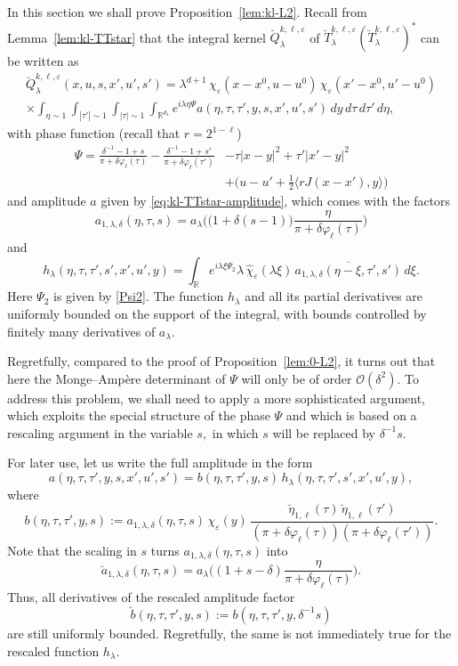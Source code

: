 \documentclass[leqno]{amsart}
\theoremstyle{definition}
\theoremstyle{remark}
\numberwithin{equation}{section}
\newcommand{\R}{\mathbb{R}}
\renewcommand{\hat}{\widehat}
\newcommand\la{{\lambda}}
\newcommand\de{{\delta}}
\begin{document}
In this section we shall prove Proposition~\ref{lem:kl-L2}. Recall from Lemma~\ref{lem:kl-TTstar} that the integral kernel $\breve Q^{k,\ell,\varepsilon}_{\lambda}$ of $\breve T^{k,\ell,\varepsilon}_\lambda(\breve T^{k,\ell,\varepsilon}_\lambda)^*$ can be written as
\begin{multline*}
\breve Q^{k,\ell,\varepsilon}_{\lambda}(x,u,s,x',u',s')
 = \lambda^{d+1}\,\chi_\varepsilon(x-x^0,u-u^0)\,\chi_\varepsilon(x'-x^0,u'-u^0) \\
\times \int_{\eta\sim 1} \int_{|\tau'|\sim 1} \int_{|\tau|\sim 1} \int_{\R^{d_1}}
e^{i\lambda \eta \Psi}
a(\eta,\tau,\tau',y,s,x',u',s')\,dy\,d\tau\,d\tau'\,d\eta,
\end{multline*}
with phase function (recall that $r=2^{1-\ell}$)
\begin{align*}
\Psi
= \frac{\delta^{-1}-1+s}{\pi+\delta\varphi_\ell(\tau)}
-\frac{\delta^{-1}-1+s'}{\pi+\delta\varphi_\ell(\tau')}
&-\tau|x-y|^2+\tau'|x'-y|^2 \\
&+\big(u-u'+\tfrac12\langle rJ(x-x'),y\rangle\big)
\end{align*}
and amplitude $a$ given by \eqref{eq:kl-TTstar-amplitude}, which comes with the factors
\[
a_{1,\la,\de}(\eta,\tau,s)
=
a_\la\Big(\big(1+\delta(s-1)\big)
\frac{\eta}{\pi+\delta\varphi_\ell(\tau)}\Big)
\]
and
\[
h_\lambda(\eta,\tau,\tau',s',x',u',y)
=
\int_\R e^{i\lambda\xi\Psi_2}
\lambda\,\hat\chi_\varepsilon(\lambda\xi)\,
\overline{a_{1,\la,\de}(\eta-\xi,\tau',s')}\,d\xi.
\]
Here $\Psi_2$ is given by \eqref{Psi2}. The function $h_\lambda$ and all its partial derivatives are uniformly bounded on the support of the integral, with bounds controlled by finitely many derivatives of $a_\la$.

Regretfully, compared to the proof of Proposition~\ref{lem:0-L2}, it turns out that here the Monge--Ampère determinant of $\Psi$ will only be of order $\mathcal{O}(\delta^2)$. To address this problem, we shall need to apply a more sophisticated argument, which exploits the special structure of the phase $\Psi$ and which is based on  a rescaling argument in the variable $s,$ in which $s$ will be replaced by $\delta^{-1} s$. 

For later use, let us write the full amplitude in the form
\[
a(\eta,\tau,\tau',y,s,x',u',s')
=
b(\eta,\tau,\tau',y,s)\,
h_\lambda(\eta,\tau,\tau',s',x',u',y),
\]
where
\begin{equation}\label{amplia}
b(\eta,\tau,\tau',y,s)
:=
a_{1,\la,\de}(\eta,\tau,s)\,\chi_\varepsilon(y)\,
\frac{\breve\eta_{1,\ell}(\tau)\,\breve\eta_{1,\ell}(\tau')}
{(\pi+\delta\varphi_\ell(\tau))(\pi+\delta\varphi_\ell(\tau'))}.
\end{equation}
Note that the scaling in $s$ turns $a_{1,\la,\de}(\eta,\tau,s)$ into
\begin{equation}\label{atilde3}
\breve a_{1,\la,\de}(\eta,\tau,s)=  a_{\la}\Big((1+s-\delta)\frac \eta{\pi + \delta \varphi_\ell(\tau)}\Big).
\end{equation}
Thus, all derivatives of the rescaled amplitude factor
\[
\breve b(\eta,\tau,\tau',y,s)
:=
b(\eta,\tau,\tau',y,\delta^{-1}s)
\]
are still uniformly bounded. Regretfully, the same is not immediately true for the rescaled function $h_\lambda$.
\end{document}
